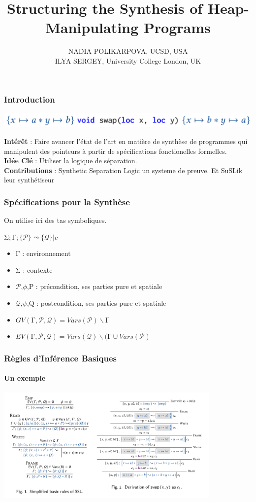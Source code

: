 \documentclass[french]{beamer}
\title{Structuring the Synthesis of Heap-Manipulating Programs}
\author{NADIA POLIKARPOVA, UCSD, USA \\ILYA SERGEY, University College London, UK}
\date{}
\begin{document}
	\maketitle
\begin{frame}[fragile]
	\frametitle{Introduction}
	
	\begin{center}
		\includegraphics[height=\baselineskip]{figures/swap.png}
	\end{center}
	\textbf{Intérêt} : Faire avancer l'état de l'art en matière de synthèse de programmes qui manipulent des pointeurs à partir de spécifications fonctionelles formelles.\\
	\textbf{Idée Clé} : Utiliser la logique de séparation.\\
	\textbf{Contributions} : Synthetic Separation Logic un systeme de preuve. Et SuSLik leur synthétiseur
\end{frame}
\begin{frame}[fragile]
	\frametitle{Spécifications pour la Synthèse}
	On utilise ici des tas symboliques.\\
	\begin{center}
	$\mathrm{\Sigma};\mathrm{\Gamma};\{\mathcal{P}\}\leadsto\{\mathcal{Q}\} | c$
	\end{center}
	\begin{itemize}
		\item $\mathrm{\Gamma}$ : environnement
		\item $\mathrm{\Sigma}$ : contexte
		\item $\mathcal{P}$,$\phi$,P : précondition, ses parties pure et spatiale
		\item $\mathcal{Q}$,$\psi$,Q : postcondition, ses parties pure et spatiale
		\item $GV(\mathrm{\Gamma},\mathcal{P},\mathcal{Q}) = Vars(\mathcal{P}) \backslash \mathrm{\Gamma}$ 
		\item $EV(\mathrm{\Gamma},\mathcal{P},\mathcal{Q}) = Vars(\mathcal{Q}) \backslash (\mathrm{\Gamma} \cup Vars(\mathcal{P})$ 
	\end{itemize}
\end{frame}
\begin{frame}[fragile]
	\frametitle{Règles d'Inférence Basiques}
	\framesubtitle{Un exemple}
	\includegraphics[width=11cm]{figures/basic.png}
\end{frame}
\end{document}
